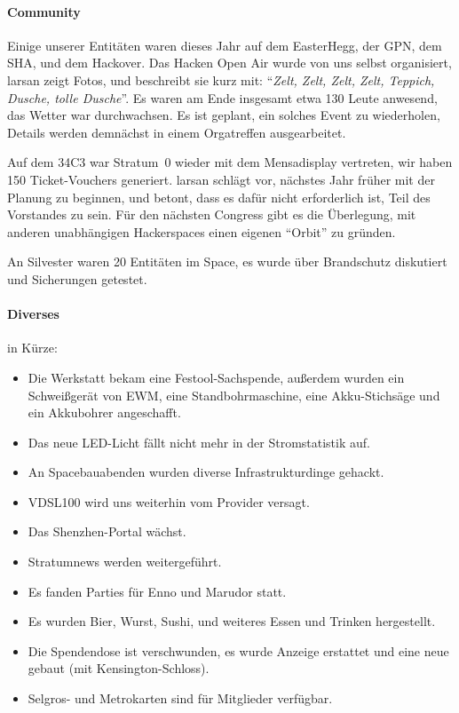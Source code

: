 \documentclass{s0minutes}
\begin{document}
\paragraph{Community}

Einige unserer Entitäten waren dieses Jahr auf dem EasterHegg, der GPN, dem SHA,
und dem Hackover. Das Hacken Open Air wurde von uns selbst organisiert, larsan
zeigt Fotos, und beschreibt sie kurz mit: "`\emph{Zelt, Zelt, Zelt, Zelt,
Teppich, Dusche, tolle Dusche}"'. Es waren am Ende insgesamt etwa 130 Leute
anwesend, das Wetter war durchwachsen. Es ist geplant, ein solches Event zu
wiederholen, Details werden demnächst in einem Orgatreffen ausgearbeitet.

Auf dem 34C3 war Stratum~0 wieder mit dem Mensadisplay vertreten, wir haben 150
Ticket-Vouchers generiert. larsan schlägt vor, nächstes Jahr früher mit der
Planung zu beginnen, und betont, dass es dafür nicht erforderlich ist, Teil des
Vorstandes zu sein.
Für den nächsten Congress gibt es die Überlegung, mit anderen unabhängigen
Hackerspaces einen eigenen "`Orbit"' zu gründen.

An Silvester waren 20 Entitäten im Space, es wurde über Brandschutz diskutiert
und Sicherungen getestet.

\paragraph{Diverses} in Kürze:

\begin{itemize}
  \item Die Werkstatt bekam eine Festool-Sachspende, außerdem wurden ein
    Schweißgerät von EWM, eine Standbohrmaschine, eine Akku-Stichsäge und ein
    Akkubohrer angeschafft.
  \item Das neue LED-Licht fällt nicht mehr in der Stromstatistik auf.
  \item An Spacebauabenden wurden diverse Infrastrukturdinge gehackt.
  \item VDSL100 wird uns weiterhin vom Provider versagt.
  \item Das Shenzhen-Portal wächst.
  \item Stratumnews werden weitergeführt.
  \item Es fanden Parties für Enno und Marudor statt.
  \item Es wurden Bier, Wurst, Sushi, und weiteres Essen und Trinken hergestellt.
  \item Die Spendendose ist verschwunden, es wurde Anzeige erstattet und eine
    neue gebaut (mit Kensington-Schloss).
  \item Selgros- und Metrokarten sind für Mitglieder verfügbar.

\end{itemize}
\end{document}
